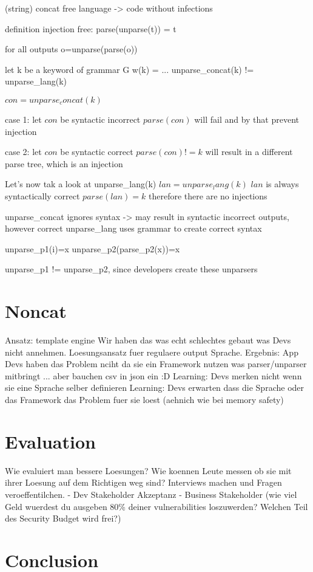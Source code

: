 \documentclass[conference]{IEEEtran}
\newcommand{\todo}[1] {\textcolor{red}{\textbf{TODO: #1}}}
\newcommand{\punchline}[1]{\textbf{Punch line: #1}}
\renewcommand{\punchline}[1]{}
\renewcommand{\todo}[1]{}
\begin{document}
\punchline{define input safe language}
(string) concat free language -> code without infections

definition injection free: parse(unparse(t)) = t

for all outputs o=unparse(parse(o))

\punchline{definition shotgun unparser}
let k be a keyword of grammar G
w(k) = ...
unparse_concat(k) != unparse_lang(k)

$con=unparse_concat(k)$

case 1: let $con$ be syntactic incorrect
$parse(con)$ will fail and by that prevent injection

case 2: let $con$ be syntactic correct
$parse(con) != k$ will result in a different parse tree, which is an injection


Let's now tak a look at unparse_lang(k)
$lan = unparse_lang(k)$
$lan$ is always syntactically correct
$parse(lan) = k$ therefore there are no injections

unparse_concat ignores syntax -> may result in syntactic incorrect outputs, however correct 
unparse_lang uses grammar to create correct syntax

unparse_p1(i)=x
unparse_p2(parse_p2(x))=x


unparse_p1 != unparse_p2, since developers create these unparsers

\section{Noncat}\label{sec:mchc}

Ansatz: template engine
Wir haben das was echt schlechtes gebaut was Devs nicht annehmen.
Loesungsansatz fuer regulaere output Sprache.
Ergebnis: App Devs haben das Problem nciht da sie ein Framework nutzen was parser/unparser mitbringt ... aber bauchen csv in json ein :D
Learning: Devs merken nicht wenn sie eine Sprache selber definieren
Learning: Devs erwarten dass die Sprache oder das Framework das Problem fuer sie loest (aehnich wie bei memory safety)


\section{Evaluation}

\todo{Wie gross ist der Bias weil wir die template engine als library und nicht als eigene sprache implementiert haben?}
\todo{brauchen wir einen zweiten ansatz mit einer DSL?}
Wie evaluiert man bessere Loesungen?
Wie koennen Leute messen ob sie mit ihrer Loesung auf dem Richtigen weg sind?
Interviews machen und Fragen veroeffentilchen.
- Dev Stakeholder Akzeptanz
- Business Stakeholder (wie viel Geld wuerdest du ausgeben 80\% deiner vulnerabilities loszuwerden? Welchen Teil des Security Budget wird frei?)

\section{Conclusion} \label{sec:conclusion}




\end{document}
